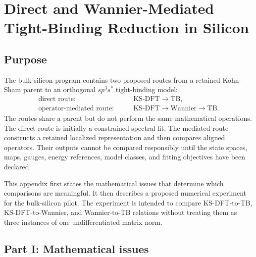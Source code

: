 \chapter{Direct and Wannier-Mediated Tight-Binding Reduction in Silicon}

\label{app:bulk-reduction-routes}


\section{Purpose}

The bulk-silicon program contains two proposed routes from a retained
Kohn--Sham parent to an orthogonal $sp^3s^{\ast}$ tight-binding model:
\begin{align}
    \text{direct route:}\qquad
    &\mathrm{KS\text{-}DFT}
    \longrightarrow
    \mathrm{TB},
    \\
    \text{operator-mediated route:}\qquad
    &\mathrm{KS\text{-}DFT}
    \longrightarrow
    \mathrm{Wannier}
    \longrightarrow
    \mathrm{TB}.
\end{align}
The routes share a parent but do not perform the same mathematical operations.
The direct route is initially a constrained spectral fit. The mediated route
constructs a retained localized representation and then compares aligned
operators. Their outputs cannot be compared responsibly until the state
spaces, maps, gauges, energy references, model classes, and fitting objectives
have been declared.

This appendix first states the mathematical issues that determine which
comparisons are meaningful. It then describes a proposed numerical experiment
for the bulk-silicon pilot. The experiment is intended to compare
KS-DFT-to-TB, KS-DFT-to-Wannier, and Wannier-to-TB relations without treating
them as three instances of one undifferentiated matrix norm.

\section{Part I: Mathematical issues}

